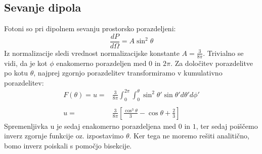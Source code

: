 \documentclass[slovene,11pt,a4paper]{article}
\numberwithin{equation}{section} %
\numberwithin{figure}{section} %
\numberwithin{table}{section} %
\begin{document}
\subsection{Sevanje dipola}
Fotoni so pri dipolnem sevanju prostorsko porazdeljeni: 
\begin{equation}
\frac{dP}{d \Omega}=A \sin^2 \theta
\end{equation}
Iz normalizacije sledi vrednost normalizacijske konstante $A=\frac{3}{8 \pi}$. Trivialno se vidi, da je kot $\phi$ enakomerno porazdeljen med $0$ in $2\pi$. Za določitev porazdelitve po kotu $\theta$, najprej zgornjo porazdelitev transformiramo v kumulativno porazdelitev:
\begin{equation}
\begin{aligned}
F(\theta)=u=&\frac{3}{8\pi}\int_0^{2\pi} \int_0^\theta  \sin^2 \theta' \sin \theta' d\theta' d\phi' \\
&\\
u=&\frac{3}{8\pi} \left[\frac{\cos^3 \theta}{3} -\cos \theta +\frac{2}{3} \right]
\end{aligned}
\end{equation}
Spremenljivka u je sedaj enakomerno porazdeljena med $0$ in $1$, ter sedaj poiščemo inverz zgornje funkcije oz. izpostavimo $\theta$. Ker tega ne moremo rešiti analitično, bomo inverz poiskali s pomočjo bisekcije. 
\end{document}
